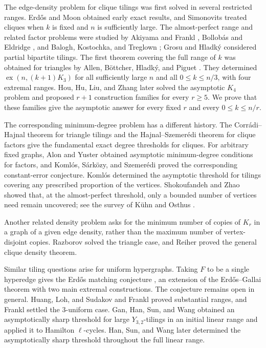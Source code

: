 \documentclass[10pt]{article}
\numberwithin{equation}{section}
\newcommand{\ex}{\operatorname{ex}}
\begin{document}
The edge-density problem for clique tilings was first solved in several restricted ranges.  Erd\H{o}s \cite{Erd62} and Moon \cite{Moon68} obtained early exact results, and Simonovits \cite{Simonovits68} treated cliques when $k$ is fixed and $n$ is sufficiently large.  The almost-perfect range and related factor problems were studied by Akiyama and Frankl \cite{AF85}, Bollob\'as and Eldridge \cite{BE78}, and Balogh, Kostochka, and Treglown \cite{BKT13}; Grosu and Hladk\'y \cite{GH12} considered partial bipartite tilings.  The first theorem covering the full range of $k$ was obtained for triangles by Allen, B\"ottcher, Hladk\'y, and Piguet \cite{ABHP15}.  They determined $\ex(n,(k+1)K_3)$ for all sufficiently large $n$ and all $0\le k\le n/3$, with four extremal ranges.  Hou, Hu, Liu, and Zhang \cite{HHLZ25} later solved the asymptotic $K_4$ problem and proposed $r+1$ construction families for every $r\ge5$.  We prove that these families give the asymptotic answer for every fixed $r$ and every $0\le k\le n/r$.

The corresponding minimum-degree problem has a different history.  The Corr\'adi--Hajnal theorem \cite{CH63} for triangle tilings and the Hajnal--Szemer\'edi theorem \cite{HS70} for clique factors give the fundamental exact degree thresholds for cliques.  For arbitrary fixed graphs, Alon and Yuster \cite{AY96} obtained asymptotic minimum-degree conditions for factors, and Koml\'os, S\'ark\"ozy, and Szemer\'edi \cite{KSS01} proved the corresponding constant-error conjecture.  Koml\'os \cite{Komlos00} determined the asymptotic threshold for tilings covering any prescribed proportion of the vertices.  Shokoufandeh and Zhao \cite{ShokoufandehZhao03} showed that, at the almost-perfect threshold, only a bounded number of vertices need remain uncovered; see the survey of K\"uhn and Osthus \cite{KO09}.

Another related density problem asks for the minimum number of copies of $K_r$ in a graph of a given edge density, rather than the maximum number of vertex-disjoint copies.  Razborov \cite{Razborov08} solved the triangle case, and Reiher \cite{Reiher16} proved the general clique density theorem.

Similar tiling questions arise for uniform hypergraphs.  Taking $F$ to be a single hyperedge gives the Erd\H{o}s matching conjecture \cite{Erdos65}, an extension of the Erd\H{o}s--Gallai theorem with two main extremal constructions.  The conjecture remains open in general.  Huang, Loh, and Sudakov \cite{HLS12} and Frankl \cite{Frankl13} proved substantial ranges, and Frankl \cite{Frankl17} settled the $3$-uniform case.  Gan, Han, Sun, and Wang \cite{GHSW21} obtained an asymptotically sharp threshold for large $Y_{3,2}$-tilings in an initial linear range and applied it to Hamilton $\ell$-cycles.  Han, Sun, and Wang \cite{HSW24} later determined the asymptotically sharp threshold throughout the full linear range.
\end{document}
